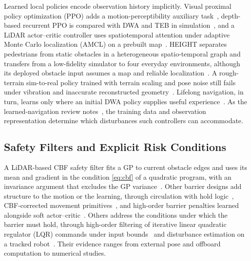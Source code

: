 Learned local policies encode observation history implicitly. Visual proximal policy optimization (PPO) adds a motion-perceptibility auxiliary task~\cite{P_M04}, depth-based recurrent PPO is compared with DWA and TEB in simulation~\cite{P_M06}, and a LiDAR actor--critic controller uses spatiotemporal attention under adaptive Monte Carlo localization (AMCL) on a prebuilt map~\cite{P_M22}. HEIGHT separates pedestrians from static obstacles in a heterogeneous spatio-temporal graph and transfers from a low-fidelity simulator to four everyday environments, although its deployed obstacle input assumes a map and reliable localization~\cite{P_R16}. A rough-terrain sim-to-real policy trained with terrain scaling and pose noise still fails under vibration and inaccurate reconstructed geometry~\cite{P_M42}. Lifelong navigation, in turn, learns only where an initial DWA policy supplies useful experience~\cite{P_M45}. As the learned-navigation review notes~\cite{P_X04}, the training data and observation representation determine which disturbances such controllers can accommodate.

\subsection{Safety Filters and Explicit Risk Conditions}

A LiDAR-based CBF safety filter fits a GP to current obstacle edges and uses its mean and gradient in the condition \eqref{eq:cbf} of a quadratic program, with an invariance argument that excludes the GP variance~\cite{P_E26}. Other barrier designs add structure to the motion or the learning, through circulation with hold logic~\cite{P_E22}, CBF-corrected movement primitives~\cite{P_E23}, and high-order barrier penalties learned alongside soft actor--critic~\cite{P_E30}. Others address the conditions under which the barrier must hold, through high-order filtering of iterative linear quadratic regulator (LQR) commands under input bounds~\cite{P_E24} and disturbance estimation on a tracked robot~\cite{P_E29}. Their evidence ranges from external pose and offboard computation to numerical studies.

